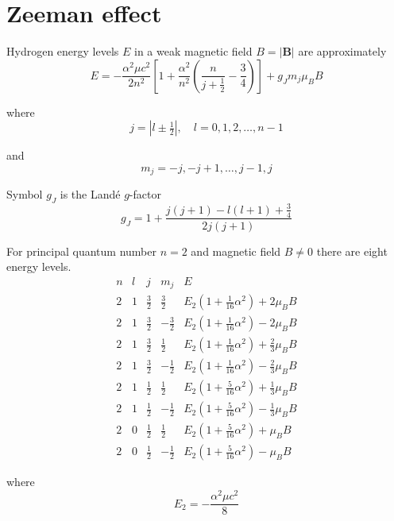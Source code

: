 

\section*{Zeeman effect}

Hydrogen energy levels $E$ in a weak magnetic field $B=|\mathbf B|$ are approximately
\begin{equation*}
E=-\frac{\alpha^2\mu c^2}{2n^2}
\left[
1+\frac{\alpha^2}{n^2}\left(\frac{n}{j+\frac{1}{2}}-\frac{3}{4}\right)
\right]+g_Jm_j\mu_BB
\end{equation*}

where
\begin{equation*}
j=\left|l\pm\tfrac{1}{2}\right|,\quad l=0,1,2,\ldots,n-1
\end{equation*}

and
\begin{equation*}
m_j=-j,-j+1,\ldots,j-1,j
\end{equation*}

Symbol $g_J$ is the Land\'e $g$-factor
\begin{equation*}
g_J=1+\frac{j(j+1)-l(l+1)+\frac{3}{4}}{2j(j+1)}
\end{equation*}

For principal quantum number $n=2$ and magnetic field $B\ne0$ there are eight energy levels.
\begin{equation*}
\begin{matrix}
n & l & j & m_j & E
\\[1ex]
2 & 1 & \frac{3}{2} & \frac{3}{2} &
E_2(1+\tfrac{1}{16}\alpha^2)+2\mu_BB
\\[1ex]
2 & 1 & \frac{3}{2} & -\frac{3}{2} &
E_2(1+\tfrac{1}{16}\alpha^2)-2\mu_BB
\\[1ex]
2 & 1 & \frac{3}{2} & \frac{1}{2} &
E_2(1+\tfrac{1}{16}\alpha^2)+\frac{2}{3}\mu_BB
\\[1ex]
2 & 1 & \frac{3}{2} & -\frac{1}{2} &
E_2(1+\tfrac{1}{16}\alpha^2)-\frac{2}{3}\mu_BB
\\[1ex]
2 & 1 & \frac{1}{2} & \frac{1}{2} &
E_2(1+\tfrac{5}{16}\alpha^2)+\frac{1}{3}\mu_BB
\\[1ex]
2 & 1 & \frac{1}{2} & -\frac{1}{2} &
E_2(1+\tfrac{5}{16}\alpha^2)-\frac{1}{3}\mu_BB
\\[1ex]
2 & 0 & \frac{1}{2} & \frac{1}{2} &
E_2(1+\tfrac{5}{16}\alpha^2)+\mu_BB
\\[1ex]
2 & 0 & \frac{1}{2} & -\frac{1}{2} &
E_2(1+\tfrac{5}{16}\alpha^2)-\mu_BB
\end{matrix}
\end{equation*}

where
\begin{equation*}
E_2=-\frac{\alpha^2\mu c^2}{8}
\end{equation*}


